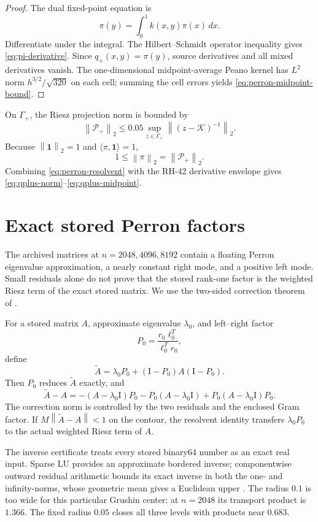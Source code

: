 \documentclass[11pt]{article}
\theoremstyle{definition}
\theoremstyle{remark}
\newcommand{\Id}{\mathrm I}
\newcommand{\cK}{\mathcal K}
\newcommand{\cP}{\mathcal P}
\newcommand{\norm}[1]{\left\lVert #1\right\rVert}
\begin{document}
\begin{proof}
The dual fixed-point equation is
\[
 \pi(y)=\int_0^1k(x,y)\pi(x)\,dx.
\]
Differentiate under the integral.  The Hilbert--Schmidt operator inequality
gives \eqref{eq:pi-derivative}.  Since
$q_+(x,y)=\pi(y)$, source derivatives and all mixed derivatives vanish.
The one-dimensional midpoint-average Peano kernel has
$L^2$ norm $h^{3/2}/\sqrt{320}$ on each cell; summing the cell errors yields
\eqref{eq:perron-midpoint-bound}.
\end{proof}

On $\Gamma_+$, the Riesz projection norm is bounded by
\[
 \norm{\cP_+}_2
 \le0.05\sup_{z\in\Gamma_+}\norm{(z-\cK)^{-1}}_2.
\]
Because $\norm{\mathbf1}_2=1$ and
$\langle\pi,\mathbf1\rangle=1$,
\[
 1\le\norm{\pi}_2=\norm{\cP_+}_2.
\]
Combining \eqref{eq:perron-resolvent} with the RH-42 derivative envelope
gives \eqref{eq:qplus-norm}--\eqref{eq:qplus-midpoint}.

\section{Exact stored Perron factors}
\label{sec:stored-perron}

The archived matrices at $n=2048,4096,8192$ contain a floating Perron
eigenvalue approximation, a nearly constant right mode, and a positive left
mode.  Small residuals alone do not prove that the stored rank-one factor is
the weighted Riesz term of the exact stored matrix.  We use the two-sided
correction theorem of \citet{WangParityKernel2026}.

For a stored matrix $A$, approximate eigenvalue $\lambda_0$, and left--right
factor
\[
 P_0=\frac{r_0\ell_0^T}{\ell_0^Tr_0},
\]
define
\begin{equation}
 \widetilde A
 =\lambda_0P_0+(\Id-P_0)A(\Id-P_0).
 \label{eq:corrected-matrix}
\end{equation}
Then $P_0$ reduces $\widetilde A$ exactly, and
\begin{equation}
 \widetilde A-A
 =-(A-\lambda_0\Id)P_0-P_0(A-\lambda_0\Id)
  +P_0(A-\lambda_0\Id)P_0.
 \label{eq:correction}
\end{equation}
The correction norm is controlled by the two residuals and the enclosed
Gram factor.  If $M\norm{\widetilde A-A}<1$ on the contour, the resolvent
identity transfers $\lambda_0P_0$ to the actual weighted Riesz term of $A$.

The inverse certificate treats every stored binary64 number as an exact real
input.  Sparse LU provides an approximate bordered inverse; componentwise
outward residual arithmetic bounds its exact inverse in both the one- and
infinity-norms, whose geometric mean gives a Euclidean upper
\citep{WangOutward2026,Rump2010}.  The radius $0.1$ is too wide for this
particular Grushin center: at $n=2048$ its transport product is $1.366$.
The fixed radius $0.05$ closes all three levels with products near $0.683$.
\end{document}
